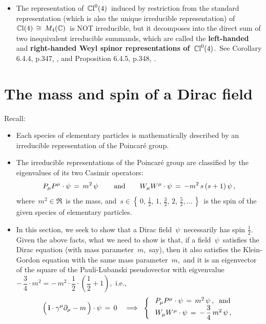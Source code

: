 \begin{itemize}
    See Definition 6.2.14, p.332, \cite{Hamilton2017}, and
    Proposition 6.5.4, p.350, \cite{Hamilton2017}.
\item
    The representation of
    \,$\mathbb{C}\textnormal{l}^{0}(4)$\,
    induced by restriction
    from the standard representation (which is also the unique irreducible representation) of 
    \,$\mathbb{C}\textnormal{l}(4) \,\cong\, M_{4}(\mathbb{C})$\,
    is NOT irreducible, but it decomposes into the direct sum of two inequivalent irreducible summands,
    which are called the \textbf{left-handed} and \textbf{right-handed Weyl spinor representations of
    \,$\mathbb{C}\textnormal{l}^{0}(4)$}.\,
    See Corollary 6.4.4, p.347, \cite{Hamilton2017}, and Proposition 6.4.5, p.348, \cite{Hamilton2017}.
\end{itemize}


\vskip 0.5cm
\section{The mass and spin of a Dirac field}

Recall:
\begin{itemize}
\item
    Each species of elementary particles is mathematically described by
    an irreducible representation of the Poincaré group.
\item
    The irreducible representations of the Poincaré group
    are classified by the eigenvalues of its two Casimir operators:
    \begin{equation*}
    P_{\mu}P^{\mu}\cdot\psi \,=\, m^{2}\,\psi\,
    \quad\quad\textnormal{and}\quad\quad
    W_{\mu}W^{\mu}\cdot\psi \,=\, -m^{2}\,s\,(s+1)\,\psi\,,
    \end{equation*}
    where \,$m^{2} \in \Re$\, is the mass, and
    \,$s \in \left\{\,0,\,\frac{1}{2},\,1,\,\frac{3}{2},\,2,\,\frac{5}{2},\ldots\,\right\}$\,
    is the spin of the given species of elementary particles.
\item
    In this section, we seek to show that a Dirac field \,$\psi$\, necessarily has spin $\frac{1}{2}$.
    Given the above facts, what we need to show is that,
    if a field \,$\psi$\, satisfies the Dirac equation (with mass parameter \,$m$,\, say),
    then it also satisfies the Klein-Gordon equation with the same mass parameter \,$m$,\,
    and it is an eigenvector of the square of the Pauli-Lubanski pseudovector with eigvenvalue 
    \,$-\,\dfrac{3}{4} \cdot m^{2} = -\,m^{2}\cdot\dfrac{1}{2}\cdot\left(\dfrac{1}{2}+1\right)$,\, i.e.,
    \begin{equation*}
    \left(\,\i\cdot\gamma^{\mu}\partial_{\mu} \overset{{\color{white}.}}{-} m\,\right)\cdot\psi \,=\, 0
    \quad\Longrightarrow\;\;
    \left\{\;\begin{array}{l}
        P_{\mu}P^{\mu}\cdot\psi \,=\, m^{2}\,\psi\,, \;\;\textnormal{and}
        \\
        W_{\mu}W^{\mu}\cdot\psi \,=\, -\,\dfrac{3}{4}\,m^{2}\,\psi\,,
        \end{array}\right.
    \end{equation*}
\end{itemize}

